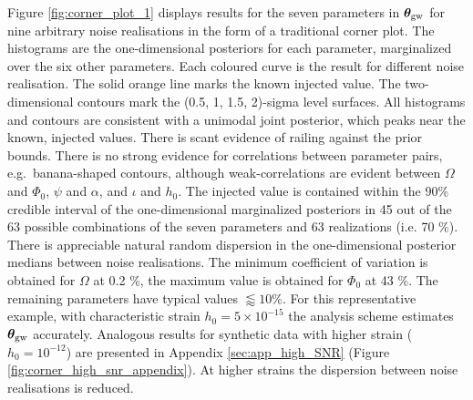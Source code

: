\documentclass[fleqn,usenatbib,useAMS]{mnras}
\begin{document}
Figure \ref{fig:corner_plot_1} displays results for the seven parameters in $\boldsymbol{\theta}_{\rm gw}$ for nine arbitrary noise realisations in the form of a traditional corner plot. The histograms are the one-dimensional posteriors for each parameter, marginalized over the six other parameters. Each coloured curve is the result for different noise realisation. The solid orange line marks the known injected value. The two-dimensional contours mark the (0.5, 1, 1.5, 2)-sigma level surfaces. All histograms and contours are consistent with a unimodal joint posterior, which peaks near the known, injected values. There is scant evidence of railing against the prior bounds. There is no strong evidence for correlations between parameter pairs, e.g.\ banana-shaped contours, although weak-correlations are evident between $\Omega$ and $\Phi_0$, $\psi$ and $\alpha$, and $\iota$ and $h_0$. The injected value is contained within the 90\% credible interval of the one-dimensional marginalized posteriors in 45 out of the 63 possible combinations of the seven parameters and 63 realizations (i.e. 70 $\%$). There is appreciable natural random dispersion in the one-dimensional posterior medians between noise realisations. The minimum coefficient of variation is obtained for $\Omega$ at  0.2 \%, the maximum value is obtained for $\Phi_0$ at 43 \%. The remaining parameters have typical values $\lessapprox 10 \%$. For this representative example, with characteristic strain $h_0 = 5 \times 10^{-15}$ the analysis scheme estimates $\boldsymbol{\theta}_{\rm gw}$ accurately. Analogous results for synthetic data with higher strain ($h_0 = 10^{-12}$) are presented in Appendix \ref{sec:app_high_SNR} (Figure \ref{fig:corner_high_snr_appendix}). At higher strains the dispersion between noise realisations is reduced. \newline 
\end{document}
